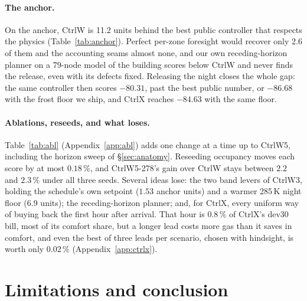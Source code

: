 \documentclass{article}
\begin{document}
\paragraph{The anchor.} On the anchor, CtrlW is 11.2 units behind the best public controller
that respects the physics \citep{stncsn2026pr2} (Table~\ref{tab:anchor}). Perfect per-zone
foresight would recover only 2.6 of them and the accounting seams almost none, and our own
receding-horizon planner on a 79-node model of the building scores below CtrlW and never finds
the release, even with its defects fixed. Releasing the night closes the whole gap: the same
controller then scores $-80.31$, past the best public number, or $-86.68$ with the frost floor we
ship, and CtrlX reaches $-84.63$ with the same floor.

\paragraph{Ablations, reseeds, and what loses.} Table~\ref{tab:abl} (Appendix~\ref{app:abl})
adds one change at a time up to CtrlW5, including the horizon sweep of \S\ref{sec:anatomy}.
Reseeding occupancy moves each score by at most $0.18\,\%$, and CtrlW5-278's gain over CtrlW
stays between $2.2$ and $2.3\,\%$ under all three seeds. Several ideas lose: the two band levers
of CtrlW3, holding the schedule's own setpoint ($1.53$ anchor units) and a warmer 285\,K night
floor ($6.9$ units); the receding-horizon planner; and, for CtrlX, every uniform way of buying
back the first hour after arrival. That hour is $0.8\,\%$ of CtrlX's dev30 bill, most of its
comfort share, but a longer lead costs more gas than it saves in comfort, and even the best of
three leads per scenario, chosen with hindsight, is worth only $0.02\,\%$
(Appendix~\ref{app:ctrlx}).





\section{Limitations and conclusion}
\end{document}
